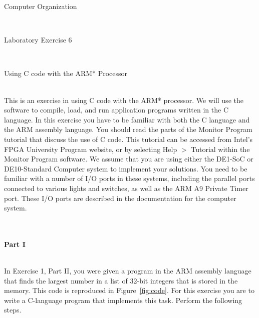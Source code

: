 \documentclass[epsfig,10pt,fullpage]{article}
\newcommand{\LabNum}{6}
\begin{document}
\centerline{\huge Computer Organization}
~\\
\centerline{\huge Laboratory Exercise \LabNum}
~\\
\centerline{\large Using C code with the ARM* Processor}
~\\

\noindent
This is an exercise in using C code with the ARM* processor.  We will use 
the {\it \productNameMedTM{}} software to compile, load, and run application programs
written in the C language.  In this exercise you have to be familiar with both the C language 
and the ARM assembly language.  You should read the parts of the Monitor Program tutorial that 
discuss the use of C code. This tutorial can be accessed from Intel's FPGA University Program 
website, or by selecting {\sf Help $>$ Tutorial} within the Monitor Program software.
We assume that you are using either the DE1-SoC or DE10-Standard Computer system to
implement your solutions. You need to be familiar with a number of I/O ports in these
systems, including the parallel ports connected to various lights and switches, as well as 
the ARM A9 Private Timer port. These I/O ports are described in the documentation for 
the computer system. 

~\\
~\\
\noindent
{\bf Part I}

~\\
\noindent
In Exercise 1, Part II, you were given a program in the ARM assembly language that finds the 
largest number in a list of 32-bit integers that is stored in the memory.  This code is 
reproduced in Figure~\ref{fig:code}. For this exercise you are to write a C-language program 
that implements this task.  Perform the following steps.
\end{document}
